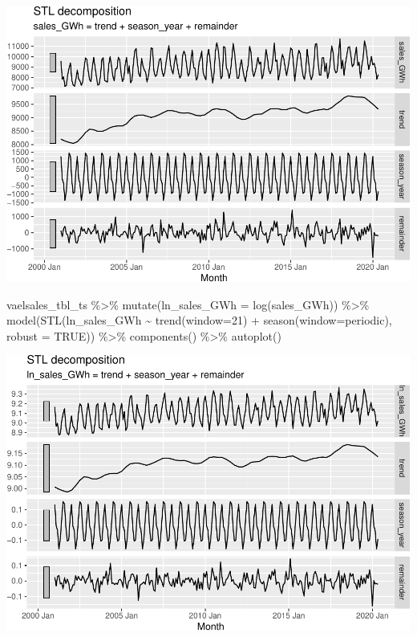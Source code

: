 \documentclass[
]{book}
\newenvironment{Shaded}{\begin{snugshade}}{\end{snugshade}}
\newcommand{\AttributeTok}[1]{\textcolor[rgb]{0.77,0.63,0.00}{#1}}
\newcommand{\ConstantTok}[1]{\textcolor[rgb]{0.00,0.00,0.00}{#1}}
\newcommand{\DecValTok}[1]{\textcolor[rgb]{0.00,0.00,0.81}{#1}}
\newcommand{\FunctionTok}[1]{\textcolor[rgb]{0.00,0.00,0.00}{#1}}
\newcommand{\NormalTok}[1]{#1}
\newcommand{\SpecialCharTok}[1]{\textcolor[rgb]{0.00,0.00,0.00}{#1}}
\newcommand{\StringTok}[1]{\textcolor[rgb]{0.31,0.60,0.02}{#1}}
\begin{document}
\includegraphics{graphics/perform additive STL decomposition of the VA electricity sales time series-1.pdf}

\begin{Shaded}
\begin{Highlighting}[]
\NormalTok{vaelsales\_tbl\_ts }\SpecialCharTok{\%\textgreater{}\%}
  \FunctionTok{mutate}\NormalTok{(}\AttributeTok{ln\_sales\_GWh =} \FunctionTok{log}\NormalTok{(sales\_GWh)) }\SpecialCharTok{\%\textgreater{}\%}
  \FunctionTok{model}\NormalTok{(}\FunctionTok{STL}\NormalTok{(ln\_sales\_GWh }\SpecialCharTok{\textasciitilde{}} \FunctionTok{trend}\NormalTok{(}\AttributeTok{window=}\DecValTok{21}\NormalTok{) }\SpecialCharTok{+} \FunctionTok{season}\NormalTok{(}\AttributeTok{window=}\StringTok{\textquotesingle{}periodic\textquotesingle{}}\NormalTok{),}
    \AttributeTok{robust =} \ConstantTok{TRUE}\NormalTok{)) }\SpecialCharTok{\%\textgreater{}\%}
  \FunctionTok{components}\NormalTok{() }\SpecialCharTok{\%\textgreater{}\%}
  \FunctionTok{autoplot}\NormalTok{()}
\end{Highlighting}
\end{Shaded}

\includegraphics{graphics/perform multiplicative STL decomposition of the VA electricity sales time series-1.pdf}
\end{document}
